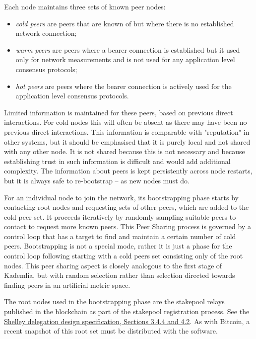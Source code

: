 \documentclass[11pt,a4paper]{article}
\begin{document}
Each node maintains three sets of known peer nodes:

\begin{itemize}
\item
  \emph{cold peers} are peers that are known of but where there is no
  established network connection;
\item
  \emph{warm peers} are peers where a bearer connection is established
  but it used only for network measurements and is not used for any
  application level consensus protocols;
\item
  \emph{hot peers} are peers where the bearer connection is actively
  used for the application level consensus protocols.
\end{itemize}

Limited information is maintained for these peers, based on previous
direct interactions. For cold nodes this will often be absent as there
may have been no previous direct interactions. This information is
comparable with "reputation" in other systems, but it should be
emphasised that it is purely local and not shared with any other node.
It is not shared because this is not necessary and because establishing
trust in such information is difficult and would add additional
complexity. The information about peers is kept persistently across node
restarts, but it is always safe to re-bootstrap -- as new nodes must do.

For an individual node to join the network, its bootstrapping phase
starts by contacting root nodes and requesting sets of other peers,
which are added to the cold peer set. It proceeds iteratively by
randomly sampling suitable peers to contact to request more known peers.
This Peer Sharing process is governed by a control loop that has a target to
find and maintain a certain number of cold peers. Bootstrapping is not a
special mode, rather it is just a phase for the control loop following
starting with a cold peers set consisting only of the root nodes. This
peer sharing aspect is closely analogous to the first stage of Kademlia,
but with random selection rather than selection directed towards finding
peers in an artificial metric space.

The root nodes used in the bootstrapping phase are the stakepool relays
published in the blockchain as part of the stakepool registration
process. See the
\href{https://hydra.iohk.io/job/Cardano/cardano-ledger-specs/delegationDesignSpec/latest/download-by-type/doc-pdf/delegation_design_spec}{{Shelley
delegation design specification, Sections 3.4.4 and 4.2}}. As with
Bitcoin, a recent snapshot of this root set must be distributed with the
software.
\end{document}
